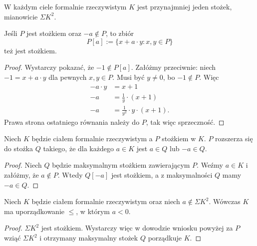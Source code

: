 \documentclass{article}
\begin{document}
\begin{uw}
	W każdym ciele formalnie rzeczywistym $K$ jest przynajmniej jeden stożek, mianowicie $\Sigma K^2$.
\end{uw}
\begin{stw}
	Jeśli $P$ jest stożkiem oraz $-a \not \in P$, to zbiór $$P[a] := \{x + a \cdot y \colon x, y \in P\}$$ też jest stożkiem.
\end{stw}
\begin{proof}
	Wystarczy pokazać, że $-1 \not \in P[a]$.
	Załóżmy przeciwnie: niech $-1 = x + a \cdot y$ dla pewnych $x, y \in P$.
	Musi być $y \neq 0$, bo $-1 \not \in P$.
	Więc
	\begin{align*}
		-a \cdot y &= x + 1 \\
		-a &= \frac{1}{y} \cdot (x + 1) \\
		-a &= \frac{1}{y^2} \cdot y \cdot (x + 1).
	\end{align*}
	Prawa strona ostatniego równania należy do  $P$, tak więc sprzeczność.
\end{proof}
\begin{wn}
	 Niech $K$ będzie ciałem formalnie rzeczywistym a $P$ stożkiem w $K$.
	 $P$ rozszerza się do stożka $Q$ takiego, że dla każdego $a \in K$ jest $a \in Q$ lub $-a \in Q$.
\end{wn}
\begin{proof}
	 Niech $Q$ będzie maksymalnym stożkiem zawierającym $P$.
	 Weźmy $a \in K$ i załóżmy, że $a \not \in P$.
	 Wtedy $Q[-a]$ jest stożkiem, a z maksymalności $Q$ mamy $-a \in Q$.
\end{proof}

\begin{wn}
	\label{wn:forrz}
	 Niech $K$ będzie ciałem formalnie rzeczywistym oraz niech $a \not \in \Sigma K^2$.
	 Wówczas $K$ ma uporządkowanie $\leq$, w którym $a < 0$.
\end{wn}
\begin{proof}
	 $\Sigma K^2$ jest stożkiem.
	 Wystarczy więc w dowodzie wniosku powyżej za $P$ wziąć $\Sigma K^2$ i otrzymany maksymalny stożek $Q$ porządkuje $K$.
\end{proof}
\end{document}
